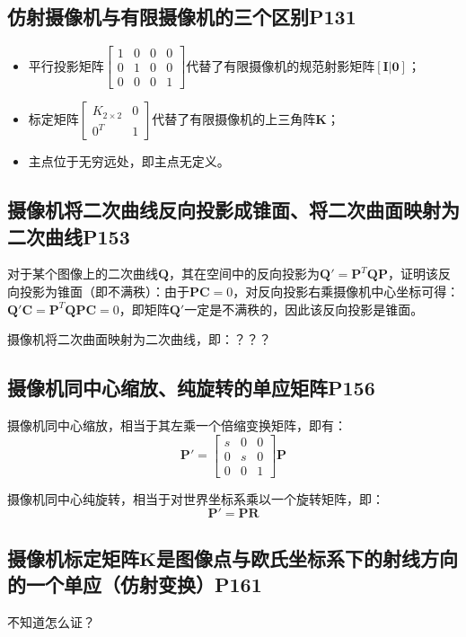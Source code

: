 \documentclass[11pt]{article}
\begin{document}
\subsection{仿射摄像机与有限摄像机的三个区别P131}
\begin{itemize}
  \item 平行投影矩阵$\begin{bmatrix}
    1&0&0&0\\
    0&1&0&0\\
    0&0&0&1
  \end{bmatrix}$代替了有限摄像机的规范射影矩阵$\mathbf{[I|0]}$；
  \item 标定矩阵$\begin{bmatrix}
    K_{2\times2}&0\\
    0^T&1
  \end{bmatrix}$代替了有限摄像机的上三角阵$\mathbf{K}$；
  \item 主点位于无穷远处，即主点无定义。
\end{itemize}
\subsection{摄像机将二次曲线反向投影成锥面、将二次曲面映射为二次曲线P153}
对于某个图像上的二次曲线$\mathbf{Q}$，其在空间中的反向投影为$\mathbf{Q}'=\mathbf{P}^T\mathbf{QP}$，证明该反向投影为锥面（即不满秩）：由于$\mathbf{PC}=0$，对反向投影右乘摄像机中心坐标可得：$\mathbf{Q}'\mathbf{C}=\mathbf{P}^T\mathbf{QPC}=0$，即矩阵$\mathbf{Q}'$一定是不满秩的，因此该反向投影是锥面。\par
摄像机将二次曲面映射为二次曲线，即：？？？
\subsection{摄像机同中心缩放、纯旋转的单应矩阵P156}
摄像机同中心缩放，相当于其左乘一个倍缩变换矩阵，即有：
\begin{equation*}
  \mathbf{P}'=\begin{bmatrix}
    s&0&0\\
    0&s&0\\
    0&0&1
  \end{bmatrix}\mathbf{P}
\end{equation*}\par
摄像机同中心纯旋转，相当于对世界坐标系乘以一个旋转矩阵，即：
\begin{equation*}
  \mathbf{P}'=\mathbf{PR}
\end{equation*}\par
\subsection{摄像机标定矩阵$\mathbf{K}$是图像点与欧氏坐标系下的射线方向的一个单应（仿射变换）P161}
不知道怎么证？
\end{document}
